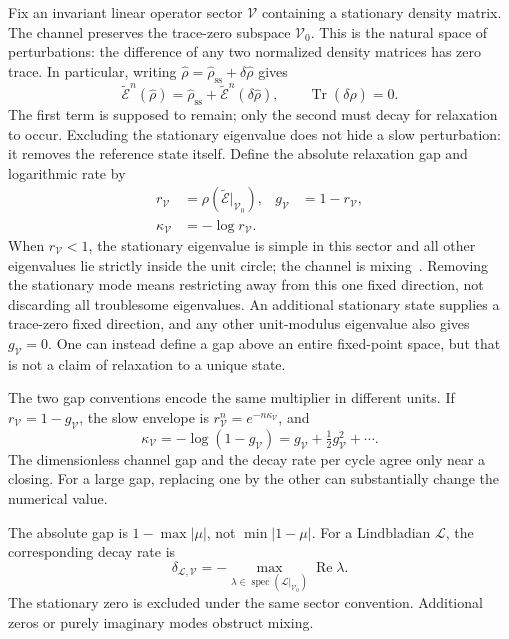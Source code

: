 \documentclass[aps,prb,onecolumn,nofootinbib,superscriptaddress,floatfix]{revtex4-2}
\newcommand{\Tr}{\operatorname{Tr}}
\newcommand{\E}{\widetilde{\mathcal E}}
\newcommand{\spec}{\operatorname{spec}}
\newcommand{\steady}{\mathrm{ss}}
\begin{document}
Fix an invariant linear operator sector $\mathcal V$ containing a
stationary density matrix. The channel preserves the trace-zero
subspace $\mathcal V_0$. This is the natural space of perturbations:
the difference of any two normalized density matrices has zero trace.
In particular, writing $\hat\rho=\hat\rho_\steady+\delta\hat\rho$ gives
\begin{equation}
 \E^n(\hat\rho)=\hat\rho_\steady+\E^n(\delta\hat\rho),
 \qquad \Tr(\delta\hat\rho)=0.
 \label{eq:state_perturbation}
\end{equation}
The first term is supposed to remain; only the second must decay
for relaxation to occur. Excluding the stationary eigenvalue does
not hide a slow perturbation: it removes the reference state itself.
Define the absolute relaxation gap and
logarithmic rate by
\begin{align}
 r_{\mathcal V}&=\rho(\E|_{\mathcal V_0}),&
 g_{\mathcal V}&=1-r_{\mathcal V},\nonumber\\
 \kappa_{\mathcal V}&=-\log r_{\mathcal V}.&&
 \label{eq:gapdef}
\end{align}
When $r_{\mathcal V}<1$, the stationary eigenvalue is simple in this
sector and all other eigenvalues lie strictly inside the unit circle;
the channel is mixing~\cite{Burgarth,Wolf}. Removing the stationary
mode means restricting away from this one fixed direction, not
discarding all troublesome eigenvalues. An additional stationary
state supplies a trace-zero fixed direction, and any other
unit-modulus eigenvalue also gives $g_{\mathcal V}=0$. One can instead
define a gap above an entire fixed-point space, but that is not a
claim of relaxation to a unique state.

The two gap conventions encode the same multiplier in different
units. If $r_{\mathcal V}=1-g_{\mathcal V}$, the slow envelope is
$r_{\mathcal V}^n=e^{-n\kappa_{\mathcal V}}$, and
\begin{equation}
 \kappa_{\mathcal V}=-\log(1-g_{\mathcal V})
     =g_{\mathcal V}+\tfrac12g_{\mathcal V}^2+\cdots.
 \label{eq:log_conversion}
\end{equation}
The dimensionless channel gap and the decay rate per cycle agree
only near a closing. For a large gap, replacing one by the other
can substantially change the numerical value.

The absolute gap is $1-\max|\mu|$, not $\min|1-\mu|$.
For a Lindbladian $\mathcal L$, the corresponding decay rate is
\begin{equation}
 \delta_{\mathcal L,\mathcal V}
   =-\max_{\lambda\in\spec(\mathcal L|_{\mathcal V_0})}
        \operatorname{Re}\lambda. \label{eq:Lgap}
\end{equation}
The stationary zero is excluded under the same sector convention.
Additional zeros or purely imaginary modes obstruct mixing.
\end{document}
